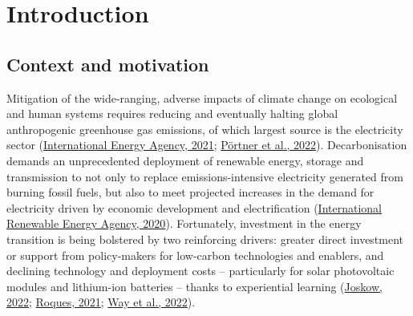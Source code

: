 \documentclass[12pt,a4paper,]{report}
\begin{document}
\newpage

\setcounter{page}{1}
\doublespacing
\setlength{\parindent}{0.5in}

\hypertarget{sec:intro}{%
\chapter{Introduction}\label{sec:intro}}

\hypertarget{context-and-motivation}{%
\section{Context and motivation}\label{context-and-motivation}}

Mitigation of the wide-ranging, adverse impacts of climate change on
ecological and human systems requires reducing and eventually halting
global anthropogenic greenhouse gas emissions, of which largest source
is the electricity sector
(\protect\hyperlink{ref-internationalenergyagencyNetZero20502021}{International
Energy Agency, 2021};
\protect\hyperlink{ref-portnerIPCC2022Climate2022}{Pörtner et al.,
2022}). Decarbonisation demands an unprecedented deployment of renewable
energy, storage and transmission to not only to replace
emissions-intensive electricity generated from burning fossil fuels, but
also to meet projected increases in the demand for electricity driven by
economic development and electrification
(\protect\hyperlink{ref-internationalrenewableenergyagencyGlobalRenewablesOutlook2020}{International
Renewable Energy Agency, 2020}). Fortunately, investment in the energy
transition is being bolstered by two reinforcing drivers: greater direct
investment or support from policy-makers for low-carbon technologies and
enablers, and declining technology and deployment costs -- particularly
for solar photovoltaic modules and lithium-ion batteries -- thanks to
experiential learning
(\protect\hyperlink{ref-joskowHierarchiesMarketsPartially2022}{Joskow,
2022}; \protect\hyperlink{ref-roquesEvolutionEuropeanModel2021a}{Roques,
2021}; \protect\hyperlink{ref-wayEmpiricallyGroundedTechnology2022}{Way
et al., 2022}).
\end{document}
